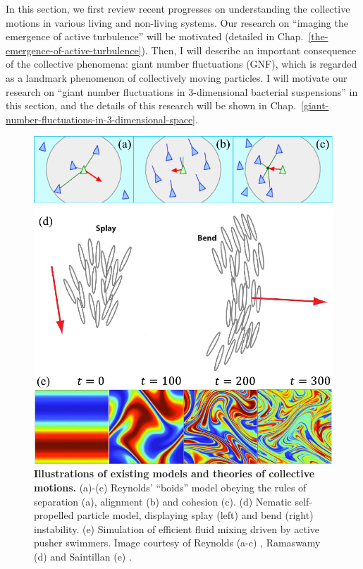 In this section, we first review recent progresses on understanding the collective motions in various living and non-living systems. Our research on ``imaging the emergence of active turbulence'' will be motivated
(detailed in Chap.~\ref{the-emergence-of-active-turbulence}). Then, I will describe an important consequence of the collective phenomena: giant number fluctuations (GNF), which is regarded as a landmark phenomenon of collectively moving particles. I will motivate our research on ``giant number fluctuations in 3-dimensional bacterial suspensions'' in this section, and the details of this research will be shown in Chap.~\ref{giant-number-fluctuations-in-3-dimensional-space}.

\begin{figure}[!htbp]
	\begin{center}
	\includegraphics[width=5.5 in]{Figs/1-Intro/4.pdf}
	\end{center}
	\caption[Figure 1.4:]
	{
	\textbf{Illustrations of existing models and theories of collective motions.}
	(a)-(c) Reynolds’ “boids” model obeying the rules of separation (a), alignment (b) and cohesion (c).
	(d) Nematic self-propelled particle model, displaying splay (left) and bend (right) instability.
	(e) Simulation of efficient fluid mixing driven by active pusher swimmers.
	Image courtesy of Reynolds (a-c) \cite{Reynolds1987}, Ramaswamy (d) \cite{Ramaswamy2010} and Saintillan (e) \cite{Saintillan2008b}.
	}
	\label{fig:models-of-collective-motions}
\end{figure}


